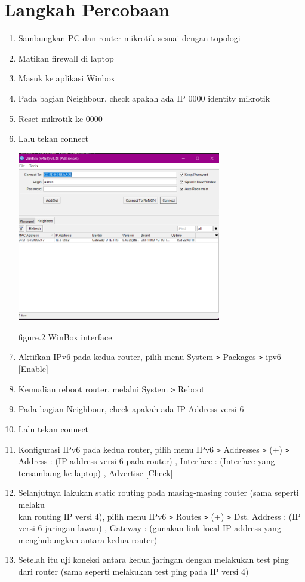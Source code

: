\section{Langkah Percobaan}
\begin{enumerate}
    \item Sambungkan PC dan router mikrotik sesuai dengan topologi
    \item Matikan firewall di laptop
    \item Masuk ke aplikasi Winbox
    \item Pada bagian Neighbour, check apakah ada IP 0000 identity mikrotik
    \item Reset mikrotik ke 0000
    \item Lalu tekan connect
    
    \begin{center}
        \includegraphics[width=0.7\textwidth]{image/Winbox-interface.png}    
        
        figure.2 WinBox interface
    \end{center}

    \item Aktifkan IPv6 pada kedua router, pilih menu System \texttt{\text>} Packages \texttt{\text>} ipv6 [Enable]
    \item Kemudian reboot router, melalui System \texttt{\text>} Reboot
    \item Pada bagian Neighbour, check apakah ada IP Address versi 6
    \item Lalu tekan connect
    \item Konfigurasi IPv6 pada kedua router, pilih menu IPv6 \texttt{\text>} Addresses \texttt{\text>} (+) \texttt{\text>} Address : (IP address versi 6 pada router) , Interface : (Interface yang tersambung ke laptop) , Advertise [Check]
    \item Selanjutnya lakukan static routing pada masing-masing router (sama seperti melaku\\kan routing IP versi 4), pilih menu IPv6 \texttt{\text>} Routes \texttt{\text>} (+) \texttt{\text>} Dst. Address : (IP versi 6 jaringan lawan) , Gateway : (gunakan link local IP address yang menghubungkan antara kedua router)
    \item Setelah itu uji koneksi antara kedua jaringan dengan melakukan test ping dari router (sama seperti melakukan test ping pada IP versi 4)
    
\end{enumerate}

